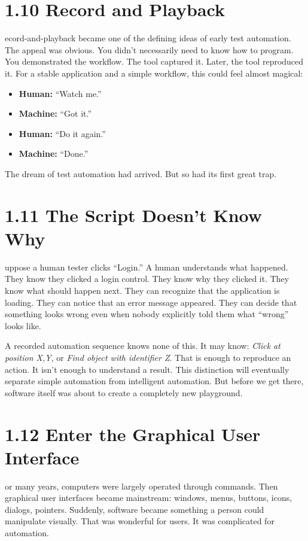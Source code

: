 \documentclass[11pt, a4paper, openany]{book}
\newcommand{\initialcap}[1]{{\fontfamily{lmss}\selectfont\huge\textbf{#1}}}
\begin{document}
\section{1.10 Record and Playback}
\noindent \initialcap{R}ecord-and-playback became one of the defining ideas of early test automation. The appeal was obvious. You didn't necessarily need to know how to program. You demonstrated the workflow. The tool captured it. Later, the tool reproduced it. For a stable application and a simple workflow, this could feel almost magical:
\begin{itemize}
    \item \textbf{Human:} ``Watch me.''
    \item \textbf{Machine:} ``Got it.''
    \item \textbf{Human:} ``Do it again.''
    \item \textbf{Machine:} ``Done.''
\end{itemize}
The dream of test automation had arrived. But so had its first great trap.

\section{1.11 The Script Doesn't Know Why}
\noindent \initialcap{S}uppose a human tester clicks ``Login.'' A human understands what happened. They know they clicked a login control. They know why they clicked it. They know what should happen next. They can recognize that the application is loading. They can notice that an error message appeared. They can decide that something looks wrong even when nobody explicitly told them what ``wrong'' looks like.

A recorded automation sequence knows none of this. It may know: \textit{Click at position X,Y}, or \textit{Find object with identifier Z}. That is enough to reproduce an action. It isn't enough to understand a result. This distinction will eventually separate simple automation from intelligent automation. But before we get there, software itself was about to create a completely new playground.

\section{1.12 Enter the Graphical User Interface}
\noindent \initialcap{F}or many years, computers were largely operated through commands. Then graphical user interfaces became mainstream: windows, menus, buttons, icons, dialogs, pointers. Suddenly, software became something a person could manipulate visually. That was wonderful for users. It was complicated for automation.
\end{document}
